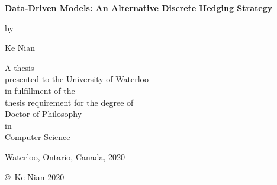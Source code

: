 \pagestyle{empty}

\begin{titlepage}
        \begin{center}
        \vspace*{1.0cm}

        \Huge
        {\bf Data-Driven Models: An Alternative Discrete Hedging Strategy }

        \vspace*{1.0cm}

        \normalsize
        by \\

        \vspace*{1.0cm}

        \Large
        Ke Nian \\

        \vspace*{3.0cm}

        \normalsize
        A thesis \\
        presented to the University of Waterloo \\
        in fulfillment of the \\
        thesis requirement for the degree of \\
        Doctor of Philosophy \\
        in \\
        Computer Science \\

        \vspace*{2.0cm}

        Waterloo, Ontario, Canada, 2020 \\

        \vspace*{1.0cm}

        \copyright\ Ke Nian 2020 \\
        \end{center}
\end{titlepage}

\pagestyle{plain}
\setcounter{page}{2}

